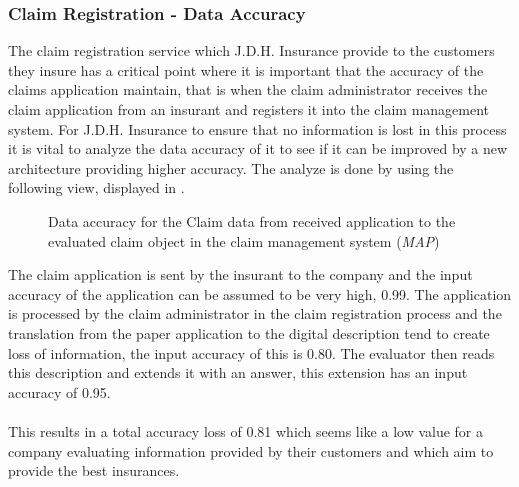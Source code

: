 \subsubsection{Claim Registration - Data Accuracy}
\label{sec:claim_analysis}
The claim registration service which J.D.H. Insurance provide to the customers they insure has a critical point where it is important that the accuracy of the claims application maintain, that is when the claim administrator receives the claim application from an insurant and registers it into the claim management system. For J.D.H. Insurance to ensure that no information is lost in this process it is vital to analyze the data accuracy of it to see if it can be improved by a new architecture providing higher accuracy. The analyze is done by using the following view, displayed in .
\begin{center}
	\begin{figure}[H]
		\centering
		\setlength\fboxsep{7pt}
		\setlength\fboxrule{0.5pt}
		\caption{Data accuracy for the Claim data from received application to the evaluated claim object in the claim management system (\emph{MAP})}
		\label{fig:map_claim_data}
	\end{figure}
\end{center}
The claim application is sent by the insurant to the company and the input accuracy of the application can be assumed to be very high, 0.99. The application is processed by the claim administrator in the claim registration process and the translation from the paper application to the digital description tend to create loss of information, the input accuracy of this is 0.80. The evaluator then reads this description and extends it with an answer, this extension has an input accuracy of 0.95.\\\\
%
This results in a total accuracy loss of 0.81 which seems like a low value for a company evaluating information provided by their customers and which aim to provide the best insurances.

%
